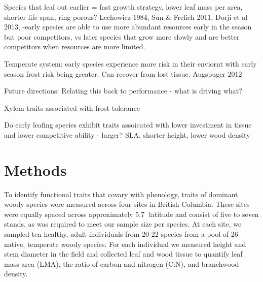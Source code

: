 \documentclass{article}\usepackage[]{graphicx}\usepackage[]{color}
\begin{document}
Species that leaf out earlier = fast growth strategy, lower leaf mass per area, shorter life span, ring porous? Lechowicz 1984, Sun & Frelich 2011, Dorji et al 2013, 
-early species are able to use more abundant resources early in the season but poor competitors, vs later species that grow more slowly and are better competitors when resources are more limited. 

Temperate system: early species experience more risk in their enviornt with early season frost risk being greater. Can recover from lost tissue. Augspuger 2012

Future directions: 
Relating this back to performance - what is driving what?

Xylem traits associated with frost tolerance \cite{Lechowicz1984}

Do early leafing species exhibit traits assoicated with lower investment in tissue and lower competitive ability - larger? SLA, shorter height, lower wood density 

\section*{Methods}
\par To identify functional traits that covary with phenology, traits of dominant woody species were measured across four sites in British Columbia. These sites were equally spaced across approximately 5.7 latitude and consist of five to seven stands, as was required to meet our sample size per species.  At each site, we sampled ten healthy, adult individuals from 20-22 species from a pool of 26 native, temperate woody species. For each individual we measured height and stem diameter in the field and collected leaf and wood tissue to quantify leaf mass area (LMA), the ratio of carbon and nitrogen (C:N), and branchwood density. 
\end{document}
